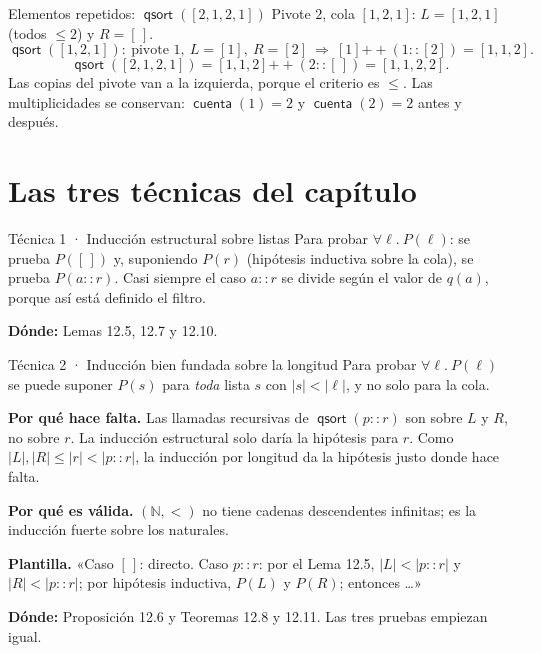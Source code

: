 \documentclass[11pt,a4paper]{article}
\newcommand{\concat}{\mathbin{+\!\!+}}
\newcommand{\qs}{\operatorname{\mathsf{qsort}}}
\newcommand{\len}[1]{\lvert #1\rvert}
\newcommand{\cuenta}{\operatorname{\mathsf{cuenta}}}
\begin{document}
\begin{ejemplo}{Elementos repetidos: \(\qs([2,1,2,1])\)}
Pivote \(2\), cola \([1,2,1]\): \(L=[1,2,1]\) (todos \(\leq2\)) y \(R=[\,]\).
\[
\qs([1,2,1]):\ \text{pivote }1,\ L=[1],\ R=[2]\ \Rightarrow\ [1]\concat(1::[2])=[1,1,2].
\]
\[
\qs([2,1,2,1])=[1,1,2]\concat(2::[\,])=[1,1,2,2].
\]
Las copias del pivote van a la izquierda, porque el criterio es \(\leq\). Las
multiplicidades se conservan: \(\cuenta(1)=2\) y \(\cuenta(2)=2\) antes y
después.
\end{ejemplo}

\section{Las tres técnicas del capítulo}

\begin{esquema}{Técnica 1 · Inducción estructural sobre listas}
Para probar \(\forall\ell.\ P(\ell)\): se prueba \(P([\,])\) y, suponiendo
\(P(r)\) (hipótesis inductiva sobre la cola), se prueba \(P(a::r)\). Casi
siempre el caso \(a::r\) se divide según el valor de \(q(a)\), porque así
está definido el filtro.

\textbf{Dónde:} Lemas 12.5, 12.7 y 12.10.
\end{esquema}

\begin{esquema}{Técnica 2 · Inducción bien fundada sobre la longitud}
Para probar \(\forall\ell.\ P(\ell)\) se puede suponer \(P(s)\) para
\emph{toda} lista \(s\) con \(\len s<\len\ell\), y no solo para la cola.

\textbf{Por qué hace falta.} Las llamadas recursivas de \(\qs(p::r)\) son
sobre \(L\) y \(R\), no sobre \(r\). La inducción estructural solo daría la
hipótesis para \(r\). Como \(\len L,\len R\leq\len r<\len{p::r}\), la
inducción por longitud da la hipótesis justo donde hace falta.

\textbf{Por qué es válida.} \((\mathbb N,<)\) no tiene cadenas descendentes
infinitas; es la inducción fuerte sobre los naturales.

\textbf{Plantilla.} «Caso \([\,]\): directo. Caso \(p::r\): por el
Lema 12.5, \(\len L<\len{p::r}\) y \(\len R<\len{p::r}\); por hipótesis
inductiva, \(P(L)\) y \(P(R)\); entonces \dots»

\textbf{Dónde:} Proposición 12.6 y Teoremas 12.8 y 12.11. Las tres pruebas
empiezan igual.
\end{esquema}
\end{document}
